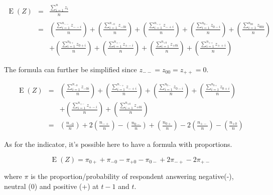 \documentclass[12pt,a4paper,oneside]{book}
\DeclareMathOperator{\E}{E}
\begin{document}
\begin{eqnarray}
    \E(Z) &=&  \frac{ \sum_{i=1}^n z_i}{n} \\ \nonumber \\
        &=& \left( \frac{ \sum_{i=1}^{n_{--}} z_{--i}}{n} \right)
     + \left( \frac{\sum_{i=1}^{n_{-0}} z_{-0i} }{n} \right)
    + \left( \frac{\sum_{i=1}^{n_{-+}} z_{-+i}}{n} \right)
    + \left( \frac{\sum_{i=1}^{n_{0-}} z_{0-i} }{n} \right)
    + \left( \frac{\sum_{i=1}^{n_{00}} z_{00i} }{n} \right) \nonumber  \\
    &&  + \left( \frac{\sum_{i=1}^{n_{0+}} z_{0+i}}{n} \right)
    + \left( \frac{\sum_{i=1}^{n_{+-}} z_{+-i} }{n} \right)
    + \left( \frac{\sum_{i=1}^{n_{+0}} z_{+0i} }{n} \right)
    + \left( \frac{\sum_{i=1}^{n_{++}} z_{++i}}{n} \right)
\end{eqnarray}

The formula can further be simplified since $z_{--} = z_{00} = z_{++} = 0$.

\begin{eqnarray}
    \E(Z) &=&  
     \left( \frac{\sum_{i=1}^{n_{-0}} z_{-0i} }{n} \right)
    + \left( \frac{\sum_{i=1}^{n_{-+}} z_{-+i}}{n} \right)
    + \left( \frac{\sum_{i=1}^{n_{0-}} z_{0-i} }{n} \right)
    + \left( \frac{\sum_{i=1}^{n_{0+}} z_{0+i}}{n} \right) \nonumber \\
&&  + \left( \frac{\sum_{i=1}^{n_{+-}} z_{+-i} }{n} \right)
    + \left( \frac{\sum_{i=1}^{n_{+0}} z_{+0i} }{n} \right) \\
    &=&  
        \left( \frac{n_{-0}}{n} \right)
    + 2 \left( \frac{n_{-+}}{n} \right)
    -   \left( \frac{n_{0-}}{n} \right)
    +   \left( \frac{n_{0+}}{n} \right) 
    - 2 \left( \frac{n_{+-}}{n} \right)
    -   \left( \frac{n_{+0}}{n} \right)
\end{eqnarray}




As for the indicator, it's possible here to have a formula with proportions.


\begin{equation}
    \E(Z) = \pi_{0+} + \pi_{-0} - \pi_{+0} - \pi_{0-} +2\pi_{-+} -2\pi_{+-} \label{eq:unweighted proprotion EIR}
\end{equation}

where $\pi$ is the proportion/probability of respondent answering negative(-), neutral (0) and positive (+) at $t-1$ and $t$. 
\end{document}
